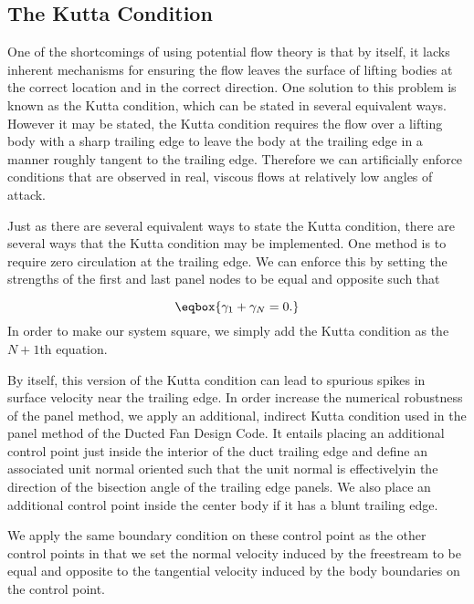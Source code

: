 \subsection{The Kutta Condition}

One of the shortcomings of using potential flow theory is that by itself, it lacks inherent mechanisms for ensuring the flow leaves the surface of lifting bodies at the correct location and in the correct direction.
%
One solution to this problem is known as the Kutta condition, which can be stated in several equivalent ways.
%
However it may be stated, the Kutta condition requires the flow over a lifting body with a sharp trailing edge to leave the body at the trailing edge in a manner roughly tangent to the trailing edge.
%
Therefore we can artificially enforce conditions that are observed in real, viscous flows at relatively low angles of attack.

Just as there are several equivalent ways to state the Kutta condition, there are several ways that the Kutta condition may be implemented.
%
One method is to require zero circulation at the trailing edge.
%
We can enforce this by setting the strengths of the first and last panel nodes to be equal and opposite such that

\begin{equation}
    \eqbox{
    \gamma_1 + \gamma_N = 0.
}
\end{equation}
%
In order to make our system square, we simply add the Kutta condition as the \(N+1\)th equation.

By itself, this version of the Kutta condition can lead to spurious spikes in surface velocity near the trailing edge.
%
In order increase the numerical robustness of the panel method, we apply an additional, indirect Kutta condition used in the panel method of the Ducted Fan Design Code.
%
It entails placing an additional control point just inside the interior of the duct trailing edge and define an associated unit normal oriented such that the unit normal is effectivelyin the direction of the bisection angle of the trailing edge panels.
%
We also place an additional control point inside the center body if it has a blunt trailing edge.

 We apply the same boundary condition on these control point as the other control points in that we set the normal velocity induced by the freestream to be equal and opposite to the tangential velocity induced by the body boundaries on the control point.

